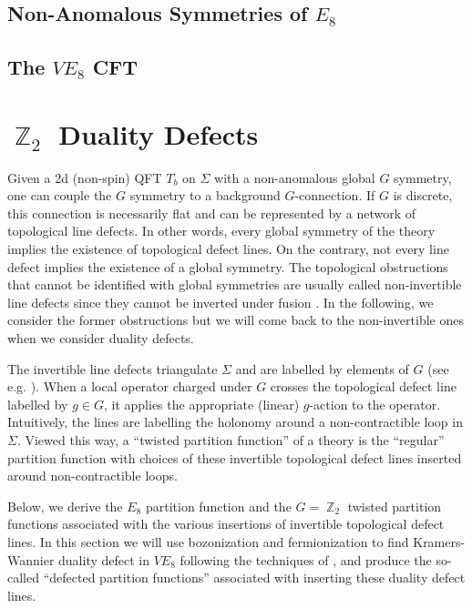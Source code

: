 \documentclass{article}
\DeclareMathOperator{\bbZ}{\mathbb{Z}}
\begin{document}
\subsection{Non-Anomalous Symmetries of \texorpdfstring{$E_8$}{E8}}

\subsection{The \texorpdfstring{$VE_8$}{VE8} CFT}

\section{\texorpdfstring{$\bbZ_2$}{Z2} Duality Defects}
Given a 2d (non-spin) QFT $T_b$ on $\Sigma$ with a non-anomalous global $G$ symmetry, one can couple the $G$ symmetry to a background $G$-connection. If $G$ is discrete, this connection is necessarily flat and can be represented by a network of  topological line defects. In other words, every global symmetry of the theory implies the existence of topological defect lines. On the contrary, not every line defect implies the existence of a global symmetry. The topological obstructions that cannot be identified with global symmetries are usually called non-invertible line defects since they cannot be inverted under fusion \cite{topDefectLines}. In the following, we consider the former obstructions but we will come back to the non-invertible ones when we consider duality defects.
\vspace{2mm}

The invertible line defects triangulate $\Sigma$ and are labelled by elements of $G$ (see e.g. \cite{generalizedSymmetries}). When a local operator charged under $G$ crosses the topological defect line labelled by $g\in G$, it applies the appropriate (linear) $g$-action to the operator. Intuitively, the lines are labelling the holonomy around a non-contractible loop in $\Sigma$. Viewed this way, a ``twisted partition function'' of a theory is the ``regular'' partition function with choices of these invertible topological defect lines inserted around non-contractible loops.
\vspace{2mm}

Below, we derive the $E_8$ partition function and the $G=\bbZ_2$ twisted partition functions associated with the various insertions of invertible topological defect lines. In this section we will use bozonization and fermionization to find Kramers-Wannier duality defect in $VE_8$ following the techniques of \cite{monsterCFT}, and produce the so-called ``defected partition functions'' associated with inserting these duality defect lines.
\end{document}
